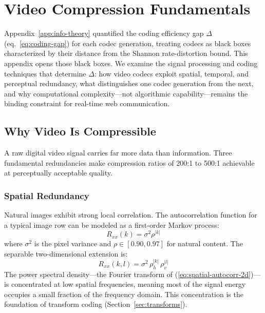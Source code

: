 %   
%   
%

\section{Video Compression Fundamentals}
\label{app:video-compression}

Appendix~\ref{app:info-theory} quantified the coding efficiency gap $\Delta$
(eq.~\ref{eq:coding-gap}) for each codec generation, treating codecs as black
boxes characterized by their distance from the Shannon rate-distortion bound.
This appendix opens those black boxes. We examine the signal processing and
coding techniques that determine $\Delta$: how video codecs exploit spatial,
temporal, and perceptual redundancy, what distinguishes one codec generation
from the next, and why computational complexity---not algorithmic
capability---remains the binding constraint for real-time web communication.

\subsection{Why Video Is Compressible}
\label{sec:compressible}

A raw digital video signal carries far more data than information. Three
fundamental redundancies make compression ratios of 200:1 to 500:1 achievable
at perceptually acceptable quality.

\subsubsection{Spatial Redundancy}

Natural images exhibit strong local correlation. The autocorrelation function
for a typical image row can be modeled as a first-order Markov process:
\begin{equation}
  R_{xx}(k) = \sigma^2 \rho^{|k|}
  \label{eq:spatial-autocorr}
\end{equation}
where $\sigma^2$ is the pixel variance and $\rho \in [0.90, 0.97]$ for
natural content. The separable two-dimensional extension is:
\begin{equation}
  R_{xx}(k, l) = \sigma^2 \,\rho_h^{|k|}\, \rho_v^{|l|}
  \label{eq:spatial-autocorr-2d}
\end{equation}
The power spectral density---the Fourier transform of
(\ref{eq:spatial-autocorr-2d})---is concentrated at low spatial frequencies,
meaning most of the signal energy occupies a small fraction of the frequency
domain. This concentration is the foundation of transform coding
(Section~\ref{sec:transforms}).

